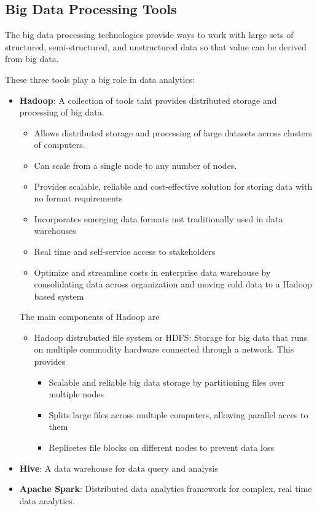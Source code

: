 \documentclass[../../ibm_data_analysis.tex]{subfiles}
\begin{document}
    \subsection{Big Data Processing Tools}

    The big data processing technologies provide ways to work with large sets of structured, semi-structured, and unstructured data so that value can be derived from big data.

    These three tools play a big role in data analytics:
    \begin{itemize}
        \item \textbf{Hadoop}: A collection of tools taht provides distributed storage and processing of big data.
        \begin{itemize}
            \item Allows distributed storage and processing of large datasets across clusters of computers.
            \item Can scale from a single node to any number of nodes.
            \item Provides scalable, reliable and cost-effective solution for storing data with no format requirements
            \item Incorporates emerging data formats not traditionally used in data warehouses
            \item Real time and self-service access to stakeholders
            \item Optimize and streamline costs in enterprise data warehouse by consolidating data across organization and moving cold data to a Hadoop based system
        \end{itemize}
        The main components of Hadoop are
        \begin{itemize}
            \item Hadoop distrubuted file system or HDFS: Storage for big data that runs on multiple commodity hardware connected through a network. This provides
            \begin{itemize}
                \item Scalable and reliable big data storage by partitioning files over multiple nodes
                \item Splits large files across multiple computers, allowing parallel acces to them
                \item Replicetes file blocks on different nodes to prevent data loss
            \end{itemize}
        \end{itemize}
        \item \textbf{Hive}: A data warehouse for data query and analysis
        \item \textbf{Apache Spark}: Distributed data analytics framework for complex, real time data analytics.
    \end{itemize}

    
\end{document}
